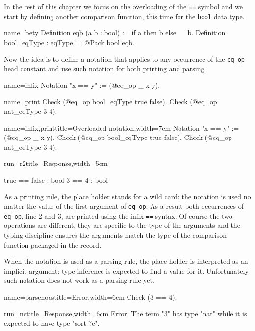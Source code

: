 In the rest of this chapter we focus on the overloading of the
\lstinline/==/ symbol and we start by defining another comparison
function, this time for the \lstinline/bool/ data type.

\begin{coq}{name=bety}{}
Definition eqb (a b : bool) := if a then b else ~~ b.
Definition bool_eqType : eqType := @Pack bool eqb.
\end{coq}

Now the idea is to define a notation that applies to any occurrence
of the \lstinline/eq_op/ head constant and use such
notation for both printing and parsing.

\begin{coqdef}{name=infix}
Notation "x == y" := (@eq_op _ x y).
\end{coqdef}
\begin{coqdef}{name=print}
Check (@eq_op bool_eqType true false).
Check (@eq_op nat_eqType 3 4).
\end{coqdef}
\begin{coq}{name=infix,print}{title=Overloaded notation,width=7cm}
Notation "x == y" := (@eq_op _ x y).
Check (@eq_op bool_eqType true false).
Check (@eq_op nat_eqType 3 4).
\end{coq}
\begin{coqout}{run=r2}{title=Response,width=5cm}

true == false : bool
3 == 4 : bool
\end{coqout}

As a printing rule, the place holder stands for a wild card: the
notation is used no matter the value of the first argument of
\lstinline/eq_op/.  As a result both occurrences of \lstinline/eq_op/,
line 2 and 3, are printed using the infix \lstinline/==/ syntax.
Of course the two operations are different, they are specific to the
type of the arguments and the typing discipline ensures the
arguments match the type of the comparison function packaged in
the record.

When the notation is used as a parsing rule, the place holder is
interpreted as an implicit argument: type inference is expected to find a value
for it.  Unfortunately such notation does not work as a parsing rule
yet.

\begin{coq}{name=parsenocs}{title=Error,width=6cm}
Check (3 == 4).
\end{coq}
\begin{coqout}{run=nc}{title=Response,width=6cm}
Error: The term "3" has type "nat" while it is expected to have type "sort ?e".
\end{coqout}

